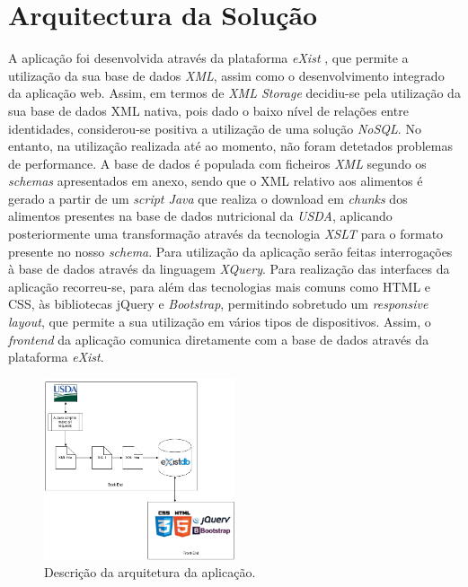 \documentclass[twocolumn,twoside,11pt,a4paper]{article}
\begin{document}
\section{Arquitectura da Solução}
A aplicação foi desenvolvida através da plataforma \textit{eXist} \cite{existdb}, que permite a utilização da sua base de dados \textit{XML}, assim como o desenvolvimento integrado da aplicação web.
Assim, em termos de \textit{XML Storage} decidiu-se pela utilização da sua base de dados XML nativa, pois dado o baixo nível de relações entre identidades, considerou-se positiva a utilização de uma solução \textit{NoSQL}. No entanto, na utilização realizada até ao momento, não foram detetados problemas de performance.
A base de dados é populada com ficheiros \textit{XML} segundo os \textit{schemas} apresentados em anexo, sendo que o XML relativo aos alimentos é gerado a partir de um \textit{script Java} que realiza o download em \textit{chunks} dos alimentos presentes na base de dados nutricional da \textit{USDA}, aplicando posteriormente uma transformação através da tecnologia \textit{XSLT} para o formato presente no nosso \textit{schema}. Para utilização da aplicação serão feitas interrogações à base de dados através da linguagem \textit{XQuery}.
Para realização das interfaces da aplicação recorreu-se, para além das tecnologias mais comuns como HTML e CSS, às bibliotecas jQuery e \textit{Bootstrap}, permitindo sobretudo um \textit{responsive layout}, que permite a sua utilização em vários tipos de dispositivos. Assim, o \textit{frontend} da aplicação comunica diretamente com a base de dados através da plataforma \textit{eXist}.


\begin{figure}[h!]
  \centering
      \includegraphics[width=0.5\textwidth]{arquitectura}
  \caption{Descrição da arquitetura da aplicação.}
\end{figure}
\end{document}

